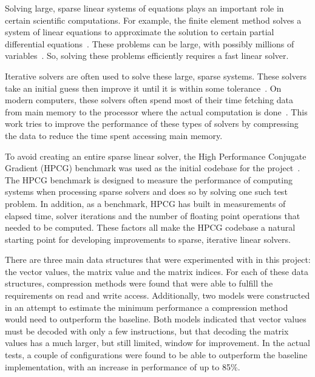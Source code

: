 Solving large, sparse linear systems of equations plays an important role in certain scientific computations.
For example, the finite element method solves a system of linear equations to approximate the solution to certain partial differential equations~\cite{Saad:2003:IterativeMethods}.
These problems can be large, with possibly millions of variables~\cite{Davis:2011:FloridaMatrixCollection}.
So, solving these problems efficiently requires a fast linear solver.

Iterative solvers are often used to solve these large, sparse systems.
These solvers take an initial guess then improve it until it is within some tolerance~\cite{Saad:2003:IterativeMethods}.
On modern computers, these solvers often spend most of their time fetching data from main memory to the processor where the actual computation is done~\cite{Lawlor:2013:compression}.
This work tries to improve the performance of these types of solvers by compressing the data to reduce the time spent accessing main memory.

To avoid creating an entire sparse linear solver, the High Performance Conjugate Gradient (HPCG) benchmark was used as the initial codebase for the project~\cite{Dongarra:2015:HPCG}.
The HPCG benchmark is designed to measure the performance of computing systems when processing sparse solvers and does so by solving one such test problem.
In addition, as a benchmark, HPCG has built in measurements of elapsed time, solver iterations and the number of floating point operations that needed to be computed.
These factors all make the HPCG codebase a natural starting point for developing improvements to sparse, iterative linear solvers.

There are three main data structures that were experimented with in this project: the vector values, the matrix value and the matrix indices.
For each of these data structures, compression methods were found that were able to fulfill the requirements on read and write access.
Additionally, two models were constructed in an attempt to estimate the minimum performance a compression method would need to outperform the baseline.
Both models indicated that vector values must be decoded with only a few instructions, but that decoding the matrix values has a much larger, but still limited, window for improvement.
In the actual tests, a couple of configurations were found to be able to outperform the baseline implementation, with an increase in performance of up to 85\%.

